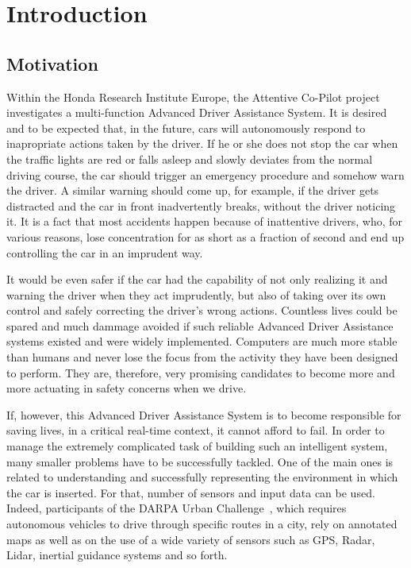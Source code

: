 \chapter{Introduction} \label{chap:intro}

\section{Motivation} \label{sect:motivation}

Within the Honda Research Institute Europe, the Attentive Co-Pilot project investigates a multi-function Advanced Driver Assistance System. It is desired and to be expected that, in the future, cars will autonomously respond to inapropriate actions taken by the driver. If he or she does not stop the car when the traffic lights are red or falls asleep and slowly deviates from the normal driving course, the car should trigger an emergency procedure and somehow warn the driver. A similar warning should come up, for example, if the driver gets distracted and the car in front inadvertently breaks, without the driver noticing it. It is a fact that most accidents happen because of inattentive drivers, who, for various reasons, lose concentration for as short as a fraction of second and end up controlling the car in an imprudent way.

It would be even safer if the car had the capability of not only realizing it and warning the driver when they act imprudently, but also of taking over its own control and safely correcting the driver's wrong actions. Countless lives could be spared and much dammage avoided if such reliable Advanced Driver Assistance systems existed and were widely implemented. Computers are much more stable than humans and never lose the focus from the activity they have been designed to perform. They are, therefore, very promising candidates to become more and more actuating in safety concerns when we drive.

If, however, this Advanced Driver Assistance System is to become responsible for saving lives, in a critical real-time context, it cannot afford to fail. In order to manage the extremely complicated task of building such an intelligent system, many smaller problems have to be successfully tackled. One of the main ones is related to understanding and successfully representing the environment in which the car is inserted. For that, number of sensors and input data can be used. Indeed, participants of the DARPA Urban Challenge~\cite{darpa:darpa}, which requires autonomous vehicles to drive through specific routes in a city, rely on annotated maps as well as on the use of a wide variety of sensors such as GPS, Radar, Lidar, inertial guidance systems and so forth.

